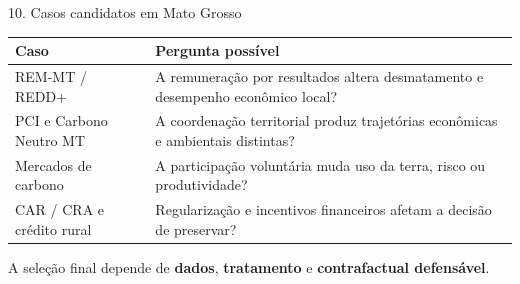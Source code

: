 \documentclass[aspectratio=169,11pt]{beamer}
\begin{document}
\begin{frame}{10. Casos candidatos em Mato Grosso}
  \small
  \begin{tabular}{p{4.1cm}p{7.3cm}}
    \toprule
    Caso & Pergunta possível \tabularnewline
    \midrule
    REM-MT / REDD+ & A remuneração por resultados altera desmatamento e desempenho
      econômico local? \tabularnewline[0.18cm]
    PCI e Carbono Neutro MT & A coordenação territorial produz trajetórias econômicas
      e ambientais distintas? \tabularnewline[0.18cm]
    Mercados de carbono & A participação voluntária muda uso da terra, risco ou
      produtividade? \tabularnewline[0.18cm]
    CAR / CRA e crédito rural & Regularização e incentivos financeiros afetam a
      decisão de preservar? \tabularnewline
    \bottomrule
  \end{tabular}

  \vfill
  \centering
  A seleção final depende de \textbf{dados}, \textbf{tratamento} e
  \textbf{contrafactual defensável}.

\end{frame}
\end{document}
